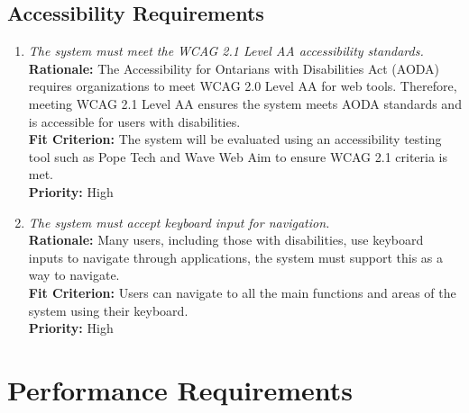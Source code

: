 \documentclass[12pt]{article}
\begin{document}
\subsection{Accessibility Requirements}
\begin{enumerate}[label=UHR-AR \arabic*., wide=0pt, leftmargin=*]
\item \emph{The system must meet the WCAG 2.1 Level AA accessibility standards.}\\[2mm] 
    {\bf Rationale:} The Accessibility for Ontarians with Disabilities Act (AODA) requires organizations to meet WCAG 2.0 Level AA for web tools. Therefore, meeting WCAG 2.1 Level AA ensures the system meets AODA standards and is accessible for users with disabilities.  \\
    {\bf Fit Criterion:} The system will be evaluated using an accessibility testing tool such as Pope Tech and Wave Web Aim to ensure WCAG 2.1 criteria is met.\\
    {\bf Priority:} High
\item \emph{The system must accept keyboard input for navigation.}\\[2mm] 
    {\bf Rationale:} Many users, including those with disabilities, use keyboard inputs to navigate through applications, the system must support this as a way to navigate.\\
    {\bf Fit Criterion:} Users can navigate to all the main functions and areas of the system using their keyboard. \\
    {\bf Priority:} High
\end{enumerate}


\section{Performance Requirements}
\end{document}

